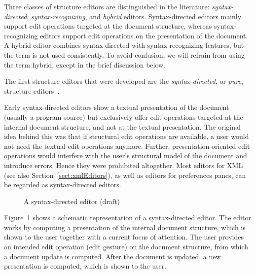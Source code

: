 Three classes of structure editors are distinguished in the literature: {\em syntax-directed}, {\em syntax-recognizing}, and {\em hybrid} editors. Syntax-directed editors mainly support edit operations targeted at the document structure, whereas syntax-recognizing editors support edit operations on the presentation of the document. A hybrid editor combines syntax-directed with syntax-recognizing features, but the term is not used consistently. To avoid confusion, we will refrain from using the term hybrid, except in the brief discussion below.


The first structure editors that were developed are the {\em syntax-directed}, or {\em pure}, structure editors~\cite{reps84synGen,Bahlke86PSG,magnusson90orm}.

Early syntax-directed editors show a textual presentation of the document (usually a program source) but exclusively offer edit operations targeted at the internal document structure, and not at the textual presentation. The original idea behind this was that if structural edit operations are available, a user would not need the textual edit operations anymore. Further, presentation-oriented edit operations would interfere with the user's structural model of the document and introduce errors. Hence they were prohibited altogether. Most editors for XML (see also Section~\ref{sect:xmlEditors}), as well as editors for preferences panes, can be regarded as syntax-directed editors.

\begin{figure}
\begin{small}
\begin{center}
\begin{center}
\begin{small}
\noindent {}
\end{small}
\end{center}\caption{A syntax-directed editor (draft)}\label{synDirEdit} 
\end{center}
\end{small}
\end{figure}


Figure~\ref{synDirEdit} shows a schematic representation of a syntax-directed editor. The editor works by computing a presentation of the internal document structure, which is shown to the user together with a current focus of attention. The user provides an intended edit operation (edit gesture) on the document structure, from which a document update is computed. After the document is updated, a new presentation is computed, which is shown to the user.

